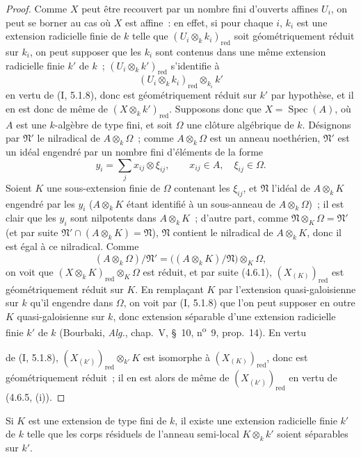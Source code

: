 \begin{proof}
Comme $X$ peut être recouvert par un nombre fini d'ouverts affines $U_i$, on
peut se borner au cas où $X$ est affine~: en effet, si pour chaque $i$, $k_i$
est une extension radicielle finie de $k$ telle que
$(U_i\otimes_k k_i)_{\mathrm{red}}$ soit géométriquement réduit sur $k_i$, on
peut supposer que les $k_i$ sont contenus dans une même extension radicielle
finie $k'$ de $k$~; $(U_i\otimes_k k')_{\mathrm{red}}$ s'identifie à
\[
(U_i\otimes_k k_i)_{\mathrm{red}}\otimes_{k_i}k'
\]
en vertu de (I, 5.1.8), donc est géométriquement réduit sur $k'$ par hypothèse,
et il en est donc de même de $(X\otimes_k k')_{\mathrm{red}}$. Supposons donc
que $X=\operatorname{Spec}(A)$, où $A$ est une $k$-algèbre de type fini, et
soit $\Omega$ une clôture algébrique de $k$. Désignons par $\mathfrak N'$ le
nilradical de $A\otimes_k\Omega$~; comme $A\otimes_k\Omega$ est un anneau
noethérien, $\mathfrak N'$ est un idéal engendré par un nombre fini d'éléments
de la forme
\[
y_i=\sum_j x_{ij}\otimes\xi_{ij},
\qquad x_{ij}\in A,\quad \xi_{ij}\in\Omega.
\]
Soient $K$ une sous-extension finie de $\Omega$ contenant les $\xi_{ij}$, et
$\mathfrak N$ l'idéal de $A\otimes_k K$ engendré par les $y_i$
($A\otimes_k K$ étant identifié à un sous-anneau de $A\otimes_k\Omega$)~; il
est clair que les $y_i$ sont nilpotents dans $A\otimes_k K$~; d'autre part,
comme $\mathfrak N\otimes_K\Omega=\mathfrak N'$ (et par suite
$\mathfrak N'\cap(A\otimes_k K)=\mathfrak N$), $\mathfrak N$ contient le
nilradical de $A\otimes_k K$, donc il est égal à ce nilradical. Comme
\[
(A\otimes_k\Omega)/\mathfrak N'
=\bigl((A\otimes_k K)/\mathfrak N\bigr)\otimes_K\Omega,
\]
on voit que $(X\otimes_k K)_{\mathrm{red}}\otimes_K\Omega$ est réduit, et par
suite (4.6.1), $(X_{(K)})_{\mathrm{red}}$ est géométriquement réduit sur $K$.
En remplaçant $K$ par l'extension quasi-galoisienne sur $k$ qu'il engendre dans
$\Omega$, on voit par (I, 5.1.8) que l'on peut supposer en outre $K$
quasi-galoisienne sur $k$, donc extension séparable d'une extension radicielle
finie $k'$ de $k$ (Bourbaki, \emph{Alg.}, chap.~V, \S~10,
n\textsuperscript{o}~9, prop.~14). En vertu


de (I, 5.1.8), $(X_{(k')})_{\mathrm{red}}\otimes_{k'}K$ est isomorphe à
$(X_{(K)})_{\mathrm{red}}$, donc est géométriquement réduit~; il en est alors de
même de $(X_{(k')})_{\mathrm{red}}$ en vertu de (4.6.5, (i)).
\end{proof}

\begin{corollary}[4.6.7]
\label{IV.2.4.6.7-fr}
Si $K$ est une extension de type fini de $k$, il existe une extension radicielle
finie $k'$ de $k$ telle que les corps résiduels de l'anneau semi-local
$K\otimes_k k'$ soient séparables sur $k'$.
\end{corollary}


